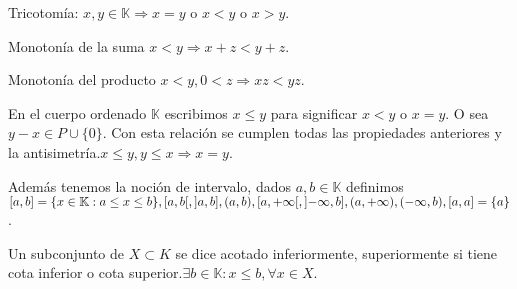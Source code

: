 \begin{prop}
    Tricotomía: \(x,y \in \mathbb{K} \Rightarrow x=y\) o \(x<y\) o \(x>y\).
\end{prop}

\begin{prop}
    Monotonía de la suma \(x<y \Rightarrow x+z<y+z\).
\end{prop}

\begin{prop}
    Monotonía del producto \(x<y, 0<z \Rightarrow xz <yz\).
\end{prop}

En el cuerpo ordenado \(\mathbb{K} \) escribimos \(x \leq y\) para significar \(x<y\) o \(x=y\). O sea \(y-x \in P \cup \{0\} \). Con esta relación se cumplen todas las propiedades anteriores y la antisimetría.\(x \leq y, y \leq x \Rightarrow x = y\).

Además tenemos la noción de intervalo, dados \(a,b \in \mathbb{K} \) definimos \([a,b ] = \{ x \in \mathbb{K} : a \leq x \leq b \}, \interval[open right]{a}{b}, \interval[open left]{a}{b}, (a,b), \interval[open right]{a}{+\infty},
\interval[open left]{-\infty}{b}, (a, +\infty), (-\infty, b), [a, a] = \{a\} \).

Un subconjunto de \(X \subset K\) se dice acotado inferiormente, superiormente si tiene cota inferior o cota superior.\(\exists b \in \mathbb{K}: x \leq b, \forall x \in X\).
